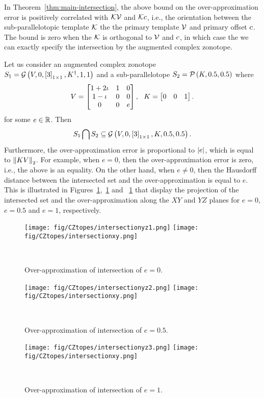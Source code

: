 %
In Theorem~\ref{thm:main-intersection}, the above bound on the over-approximation error is positively
correlated with
$\mathcal{K}\mathcal{V}$ and $\mathcal{K}c$, i.e., the orientation between the
sub-parallelotopic template $\mathcal{K}$ the the primary template $\mathcal{V}$
and primary offset $c$.  The bound is zero when the $\mathcal{K}$ is orthogonal to
$\mathcal{V}$ and $c$, in which case the we can exactly specify the
intersection by the augmented complex zonotope.
%
\begin{example}
Let us consider an augmented complex zonotope\\
${S_1=\mathcal{G}\left(V,0,\left[3\right]_{1\times 1},{K}^\dagger,1,1\right)}$ and a
sub-parallelotope $S_2=\mathcal{P}\left(K,0.5,0.5\right)$ where
%
\[
V = \left[\begin{matrix}
1+2\iota & 1 & 0\\
1-\iota & 0 & 0\\
0 & 0 & e
\end{matrix}\right],~~
K = \left[\begin{matrix}0 & 0 & 1\end{matrix}\right].
\]
%
for some $e\in \mathbb{R}$.  Then
%
\[
S_1\bigcap S_2\subseteq \mathcal{G}\left(V,0,\left[3\right]_{1\times 1},K,0.5,0.5\right).
\]
%
Furthermore, the over-approximation error is proportional to
$\left|e\right|$, which is equal to $\left\|KV\right\|_2$.  For example, when
$e=0$, then the over-approximation error is zero, i.e., the above is
an equality.  On the other hand, when $e\neq 0$, then the Hausdorff
distance between the intersected set and the over-approximation is
equal to $e$.  This is illustrated in
Figures~\ref{fig:overapp1},~\ref{fig:overapp1} and ~\ref{fig:overapp1}
that display the projection of the intersected set and the
over-approximation along the $XY$ and $YZ$ planes for ${e=0}$, $e=0.5$
and $e=1$, respectively.
\end{example}
%
%
\begin{figure}
\center
\texttt{[image: fig/CZtopes/intersectionyz1.png]}
\texttt{[image: fig/CZtopes/intersectionxy.png]}
\caption{Over-approximation of intersection of $e=0$.}~\label{fig:overapp1}
\end{figure}
%
%
\begin{figure}
\center
\texttt{[image: fig/CZtopes/intersectionyz2.png]}
\texttt{[image: fig/CZtopes/intersectionxy.png]}
\caption{Over-approximation of intersection of $e=0.5$.}~\label{fig:overapp2}
\end{figure}
%
\begin{figure}
\center
\texttt{[image: fig/CZtopes/intersectionyz3.png]}
\texttt{[image: fig/CZtopes/intersectionxy.png]}
\caption{Over-approximation of intersection of $e=1$.}~\label{fig:overapp3}
\end{figure}
%
